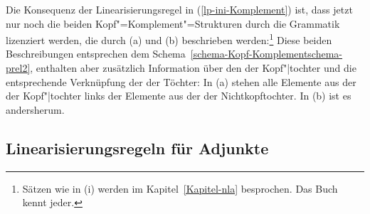 Die Konsequenz der Linearisierungsregel in (\ref{lp-ini-Komplement}) ist, dass jetzt nur noch die beiden 
Kopf"=Komplement"=Strukturen durch die Grammatik lizenziert werden, die durch (a) und
(b) beschrieben werden:\footnote{
  Sätzen wie in (i) werden im Kapitel~\ref{Kapitel-nla} besprochen.
  \ea
  Das Buch kennt jeder.
  \zlast
}
\eal
\ex {}
\ex {}
\zl
Diese beiden Beschreibungen entsprechen dem Schema~\ref{schema-Kopf-Komplementschema-prel2},
enthalten aber zusätzlich Information über den \initialw der
Kopf"|tochter und die entsprechende Verknüpfung der \phonwe
der Töchter: In (a) stehen alle Elemente aus der \phonl der Kopf"|tochter
links der Elemente aus der \phonl der Nichtkopftochter. In (b)
ist es andersherum.


\subsection{Linearisierungsregeln für Adjunkte}

